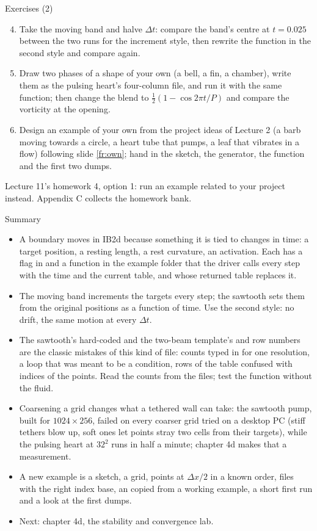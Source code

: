 \documentclass[aspectratio=169,11pt]{beamer}
\begin{document}
\begin{frame}{Exercises (2)}
\label{fr:exercises2}
\small
\begin{enumerate}
  \setcounter{enumi}{3}
  \item Take the moving band and halve $\Delta t$: compare the band's centre at $t = 0.025$ between the two runs for the increment style, then rewrite the function in the second style and compare again.
  \item Draw two phases of a shape of your own (a bell, a fin, a chamber), write them as the pulsing heart's four-column file, and run it with the same function; then change the blend to $\frac12(1 - \cos 2\pi t/P)$ and compare the vorticity at the opening.
  \item Design an example of your own from the project ideas of Lecture 2 (a barb moving towards a circle, a heart tube that pumps, a leaf that vibrates in a flow) following slide \ref{fr:own}; hand in the sketch, the generator, the function and the first two dumps.
\end{enumerate}
Lecture 11's homework 4, option 1: run an example related to your project instead. Appendix C collects the homework bank.
\end{frame}

\begin{frame}{Summary}
\label{fr:summary}
\footnotesize
\begin{itemize}
  \item A boundary moves in IB2d because something it is tied to changes in time: a target position, a resting length, a rest curvature, an activation. Each has a flag in  and a function in the example folder that the driver calls every step with the time and the current table, and whose returned table replaces it.
  \item The moving band increments the targets every step; the sawtooth sets them from the original positions as a function of time. Use the second style: no drift, the same motion at every $\Delta t$.
  \item The sawtooth's hard-coded  and the two-beam template's  and row numbers are the classic mistakes of this kind of file: counts typed in for one resolution, a loop that was meant to be a condition, rows of the table confused with indices of the points. Read the counts from the files; test the function without the fluid.
  \item Coarsening a grid changes what a tethered wall can take: the sawtooth pump, built for $1024 \times 256$, failed on every coarser grid tried on a desktop PC (stiff tethers blow up, soft ones let points stray two cells from their targets), while the pulsing heart at $32^2$ runs in half a minute; chapter 4d makes that a measurement.
  \item A new example is a sketch, a grid, points at $\Delta x/2$ in a known order, files with the right index base, an  copied from a working example, a short first run and a look at the first dumps.
  \item Next: chapter 4d, the stability and convergence lab.
\end{itemize}
\end{frame}
\end{document}

